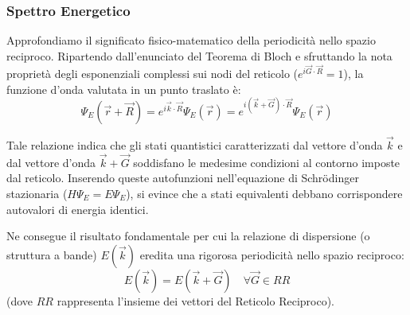 \subsubsection{Spettro Energetico}

Approfondiamo il significato fisico-matematico della periodicità nello spazio reciproco. Ripartendo dall'enunciato del Teorema di Bloch e sfruttando la nota proprietà degli esponenziali complessi sui nodi del reticolo (\(e^{i\vec{G}\cdot\vec{R}} = 1\)), la funzione d'onda valutata in un punto traslato è:
\begin{equation}
    \Psi_E(\vec{r} + \vec{R}) = e^{i\vec{k}\cdot\vec{R}} \Psi_E(\vec{r}) = e^{i(\vec{k} + \vec{G})\cdot\vec{R}} \Psi_E(\vec{r})
\end{equation}

Tale relazione indica che gli stati quantistici caratterizzati dal vettore d'onda \(\vec{k}\) e dal vettore d'onda \(\vec{k} + \vec{G}\) soddisfano le medesime condizioni al contorno imposte dal reticolo. Inserendo queste autofunzioni nell'equazione di Schrödinger stazionaria (\(H\Psi_E = E\Psi_E\)), si evince che a stati equivalenti debbano corrispondere autovalori di energia identici.

Ne consegue il risultato fondamentale per cui la relazione di dispersione (o struttura a bande) \(E(\vec{k})\) eredita una rigorosa periodicità nello spazio reciproco:
\begin{equation}
    \boxed{E(\vec{k}) = E(\vec{k} + \vec{G})} \quad \forall \vec{G} \in RR
\end{equation}
(dove \(RR\) rappresenta l'insieme dei vettori del Reticolo Reciproco).

